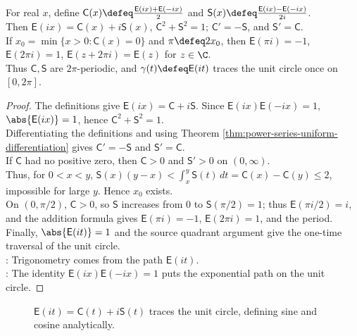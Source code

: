 \begin{theorem} \label{thm:trigonometric-functions-from-exponential} \\
For real $x$, define $\mathsf{C}(x)\defeq\frac{\mathsf{E}(ix)+\mathsf{E}(-ix)}{2}$ and $\mathsf{S}(x)\defeq\frac{\mathsf{E}(ix)-\mathsf{E}(-ix)}{2i}$.\\
Then $\mathsf{E}(ix)=\mathsf{C}(x)+i\mathsf{S}(x)$, $\mathsf{C}^2+\mathsf{S}^2=1$; $\mathsf{C}'=-\mathsf{S}$, and $\mathsf{S}'=\mathsf{C}$.\\
If $x_0=\min\{x>0:\mathsf{C}(x)=0\}$ and $\pi\defeq2x_0$, then $\mathsf{E}(\pi i)=-1$, $\mathsf{E}(2\pi i)=1$, $\mathsf{E}(z+2\pi i)=\mathsf{E}(z)$ for $z\in\C$.\\
Thus $\mathsf{C},\mathsf{S}$ are $2\pi$-periodic, and $\gamma(t)\defeq \mathsf{E}(it)$ traces the unit circle once on $[0,2\pi]$.
\begin{proof}
The definitions give $\mathsf{E}(ix)=\mathsf{C}+i\mathsf{S}$. Since $\mathsf{E}(ix)\mathsf{E}(-ix)=1$, $\abs{\mathsf{E}(ix)}=1$, hence $\mathsf{C}^2+\mathsf{S}^2=1$.\\
Differentiating the definitions and using Theorem \ref{thm:power-series-uniform-differentiation} gives $\mathsf{C}'=-\mathsf{S}$ and $\mathsf{S}'=\mathsf{C}$.\\
If $\mathsf{C}$ had no positive zero, then $\mathsf{C}>0$ and $\mathsf{S}'>0$ on $(0,\infty)$.\\
Thus, for $0<x<y$, $\mathsf{S}(x)(y-x)<\int_x^y \mathsf{S}(t)\,dt=\mathsf{C}(x)-\mathsf{C}(y)\leq2$, impossible for large $y$. Hence $x_0$ exists.\\
On $(0,\pi/2)$, $\mathsf{C}>0$, so $\mathsf{S}$ increases from $0$ to $\mathsf{S}(\pi/2)=1$; thus $\mathsf{E}(\pi i/2)=i$, and the addition formula gives $\mathsf{E}(\pi i)=-1$, $\mathsf{E}(2\pi i)=1$, and the period.\\
Finally, $\abs{\mathsf{E}(it)}=1$ and the source quadrant argument give the one-time traversal of the unit circle.\\
: Trigonometry comes from the path $\mathsf{E}(it)$.\\
: The identity $\mathsf{E}(ix)\mathsf{E}(-ix)=1$ puts the exponential path on the unit circle.
\end{proof}
\end{theorem}

\begin{figure}[H]
  \centering
  
  \caption{$\mathsf{E}(it)=\mathsf{C}(t)+i\mathsf{S}(t)$ traces the unit circle, defining sine and cosine analytically.}
  \label{fig:exponential-unit-circle}
\end{figure}

